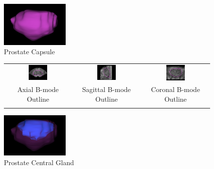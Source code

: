 \begin{figure}[htb!]
\centering
\includegraphics[width=0.3\textwidth]{tyler/3D_capsule.png} \\
Prostate Capsule \\
\vspace{3 mm}
\begin{tabular}{ccc}
\includegraphics[width=0.3\textwidth]{tyler/axial_bmode.png} &
\includegraphics[width=0.3\textwidth]{tyler/sagittal_bmode.png} &
\includegraphics[width=0.3\textwidth]{tyler/coronal_bmode.png} \\
Axial B-mode Outline & Sagittal B-mode Outline & Coronal B-mode Outline \\
\vspace{5 mm}
\end{tabular}
\includegraphics[width=0.3\textwidth]{tyler/3D_CG.png} \\
Prostate Central Gland \\

\end{figure}
